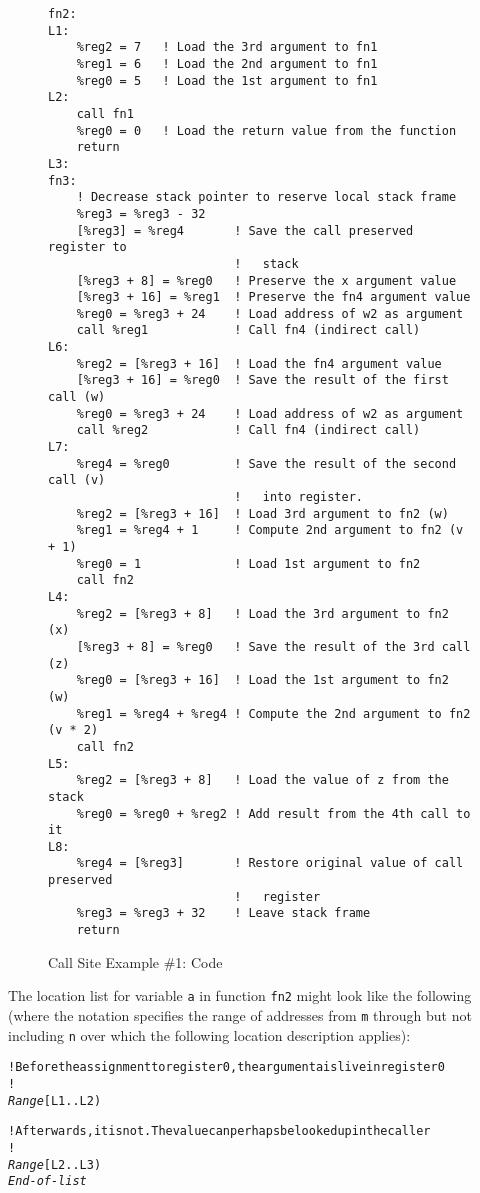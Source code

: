 \begin{figure}[ht]
\begin{lstlisting}
fn2:
L1:
    %reg2 = 7   ! Load the 3rd argument to fn1
    %reg1 = 6   ! Load the 2nd argument to fn1
    %reg0 = 5   ! Load the 1st argument to fn1
L2:
    call fn1
    %reg0 = 0   ! Load the return value from the function
    return
L3:
fn3:
    ! Decrease stack pointer to reserve local stack frame
    %reg3 = %reg3 - 32
    [%reg3] = %reg4       ! Save the call preserved register to
                          !   stack
    [%reg3 + 8] = %reg0   ! Preserve the x argument value
    [%reg3 + 16] = %reg1  ! Preserve the fn4 argument value
    %reg0 = %reg3 + 24    ! Load address of w2 as argument
    call %reg1            ! Call fn4 (indirect call)
L6:
    %reg2 = [%reg3 + 16]  ! Load the fn4 argument value
    [%reg3 + 16] = %reg0  ! Save the result of the first call (w)
    %reg0 = %reg3 + 24    ! Load address of w2 as argument
    call %reg2            ! Call fn4 (indirect call)
L7:
    %reg4 = %reg0         ! Save the result of the second call (v) 
                          !   into register.
    %reg2 = [%reg3 + 16]  ! Load 3rd argument to fn2 (w)
    %reg1 = %reg4 + 1     ! Compute 2nd argument to fn2 (v + 1)
    %reg0 = 1             ! Load 1st argument to fn2
    call fn2
L4:
    %reg2 = [%reg3 + 8]   ! Load the 3rd argument to fn2 (x)
    [%reg3 + 8] = %reg0   ! Save the result of the 3rd call (z)
    %reg0 = [%reg3 + 16]  ! Load the 1st argument to fn2 (w)
    %reg1 = %reg4 + %reg4 ! Compute the 2nd argument to fn2 (v * 2)
    call fn2
L5:
    %reg2 = [%reg3 + 8]   ! Load the value of z from the stack
    %reg0 = %reg0 + %reg2 ! Add result from the 4th call to it
L8:
    %reg4 = [%reg3]       ! Restore original value of call preserved 
                          !   register
    %reg3 = %reg3 + 32    ! Leave stack frame
    return
\end{lstlisting}
\caption{Call Site Example \#1: Code}
\label{fig:callsiteexample1code}
\end{figure}

\clearpage
The location list for variable \texttt{a} in function \texttt{fn2}
might look like the following 
(where the notation \doublequote{\textit{Range} [\texttt{m .. n)}} 
specifies the range of addresses from \texttt{m} through but not 
including \texttt{n} over which the following
location description applies):

\begin{dwflisting}
\begin{alltt}

    ! Before the assignment to register 0, the argument a is live in register 0
    !
    \textit{Range} [L1 .. L2) 
        \DWOPregzero

    ! Afterwards, it is not. The value can perhaps be looked up in the caller
    !
    \textit{Range} [L2 .. L3) 
         \DWOPregzero \DWOPstackvalue
    \textit{End-of-list}

\end{alltt}
\end{dwflisting}


